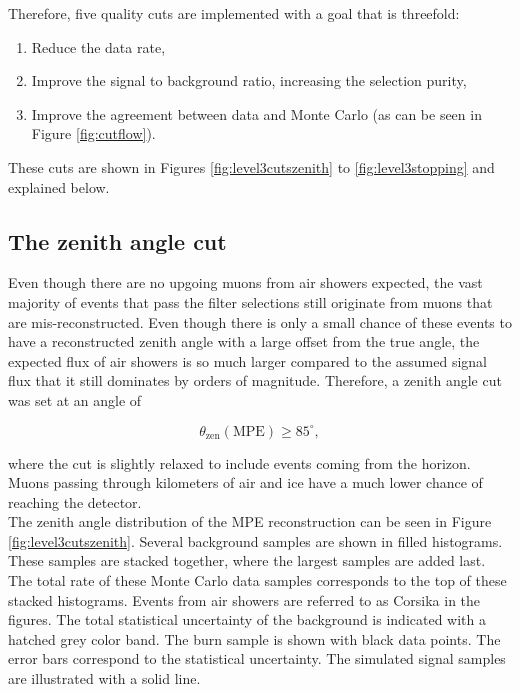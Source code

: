Therefore, five quality cuts are implemented with a goal that is threefold:
\vspace{2mm}
\begin{enumerate}
\item Reduce the data rate,
\item Improve the signal to background ratio, increasing the selection purity,
\item Improve the agreement between data and Monte Carlo (as can be seen in Figure \ref{fig:cutflow}).
\end{enumerate}
\vspace{2mm}
\noindent These cuts are shown in Figures \ref{fig:level3cutszenith} to \ref{fig:level3stopping} and explained below.


\subsection{The zenith angle cut}
\label{subsec:zenithanglecut}
Even though there are no upgoing muons from air showers expected, the vast majority of events that pass the filter selections still originate from muons that are mis-reconstructed. Even though there is only a small chance of these events to have a reconstructed zenith angle with a large offset from the true angle, the expected flux of air showers is so much larger compared to the assumed signal flux that it still dominates by orders of magnitude. Therefore, a zenith angle cut was set at an angle of 

\begin{equation}
\theta_\textrm{zen} (\textrm{MPE}) \geq 85^\circ,
\end{equation}

\noindent where the cut is slightly relaxed to include events coming from the horizon. Muons passing through kilometers of air and ice have a much lower chance of reaching the detector.\\

\noindent The zenith angle distribution of the MPE reconstruction can be seen in Figure \ref{fig:level3cutszenith}. Several background samples are shown in filled histograms. These samples are stacked together, where the largest samples are added last. The total rate of these Monte Carlo data samples corresponds to the top of these stacked histograms. Events from air showers are referred to as Corsika in the figures. The total statistical uncertainty of the background is indicated with a hatched grey color band. The burn sample is shown with black data points. The error bars correspond to the statistical uncertainty. The simulated signal samples are illustrated with a solid line.

